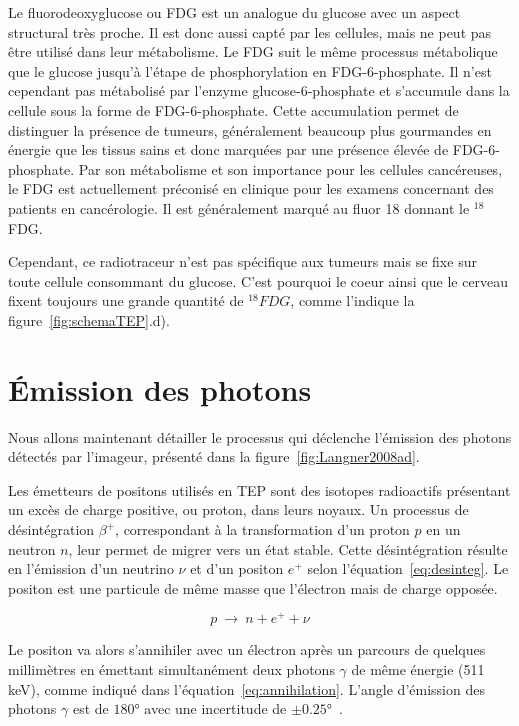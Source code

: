 Le fluorodeoxyglucose ou FDG est un analogue du glucose avec un aspect structural très proche. Il est donc aussi capté par les cellules, mais ne peut pas être utilisé dans leur métabolisme. Le FDG suit le même processus métabolique que le glucose jusqu’à l’étape de phosphorylation en FDG-6-phosphate. Il n’est cependant pas métabolisé par l’enzyme glucose-6-phosphate et s’accumule dans la cellule sous la forme de FDG-6-phosphate. Cette accumulation permet de distinguer la présence de tumeurs, généralement beaucoup plus gourmandes en énergie que les tissus sains et donc marquées par une présence élevée de FDG-6-phosphate. Par son métabolisme et son importance pour les cellules cancéreuses, le FDG est actuellement préconisé en clinique pour les examens concernant des patients en cancérologie. Il est généralement marqué au fluor 18 donnant le $^{18}$FDG.

Cependant, ce radiotraceur n'est pas spécifique aux tumeurs mais se fixe sur toute cellule consommant du glucose. C'est pourquoi le coeur ainsi que le cerveau fixent toujours une grande quantité de $^{18}FDG$, comme l'indique la figure~\ref{fig:schemaTEP}.d).

\section{\'Emission des photons}

Nous allons maintenant détailler le processus qui déclenche l'émission des photons détectés par l'imageur, présenté dans la figure~\ref{fig:Langner2008ad}.

Les émetteurs de positons utilisés en TEP sont des isotopes radioactifs présentant un excès de charge positive, ou proton, dans leurs noyaux. Un processus de désintégration $\beta^+$, correspondant à la transformation d’un proton $p$ en un neutron $n$, leur permet de migrer vers un état stable. Cette désintégration résulte en l’émission d’un neutrino $\nu$ et d’un positon $e^+$ selon l’équation~\ref{eq:desinteg}. Le positon est une particule de même masse que l’électron mais de charge opposée.

\begin{equation}
 p~\rightarrow~n + e^+ + \nu
\label{eq:desinteg}
\end{equation}

Le positon va alors s'annihiler avec un électron après un parcours de quelques millimètres en émettant simultanément deux photons $\gamma$ de même énergie (511 keV), comme indiqué dans l'équation~\ref{eq:annihilation}. L'angle d'émission des photons $\gamma$ est de $180°$ avec une incertitude de $\pm 0.25°$~\cite{bailey2005positon}.

